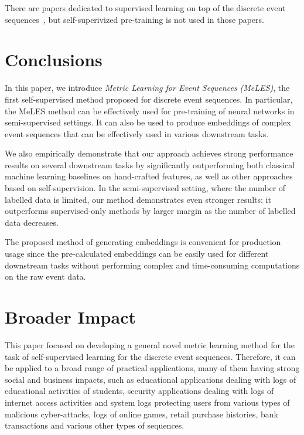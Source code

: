 \documentclass{article}
\begin{document}
There are papers dedicated to supervised learning on top of the discrete event sequences~\cite{Babaev2019ETRNNAD}, but self-superivized pre-training is not used in those papers.

\section{Conclusions} \label{sec-conclusions}

In this paper, we introduce \emph{Metric Learning for Event Sequences (MeLES)}, the first self-supervised method proposed for discrete event sequences.
In particular, the MeLES method can be effectively used for pre-training of neural networks in semi-supervised settings. It can also be used to produce embeddings of complex event sequences that can be effectively used in various downstream tasks.

We also empirically demonstrate that our approach achieves strong performance results on several downstream tasks by significantly outperforming both classical machine learning baselines on hand-crafted features, as well as other approaches based on self-supervision.
In the semi-supervised setting, where the number of labelled data is limited, our method demonstrates even stronger results: it outperforms supervised-only methods by larger margin as the number of labelled data decreases.

The proposed method of generating embeddings is convenient for production usage since the pre-calculated embeddings can be easily used for different downstream tasks without performing complex and time-consuming computations on the raw event data.

\section*{Broader Impact}

This paper focused on developing a general novel metric learning method for the task of self-supervised learning for the discrete event sequences. Therefore, it can be applied to a broad range of practical applications, many of them having strong social and business impacts, such as educational applications dealing with logs of educational activities of  students, security applications dealing with logs of internet access activities and system logs protecting users from various types of malicious cyber-attacks, logs of online games, retail purchase histories, bank transactions and various other types of sequences. 
\end{document}
